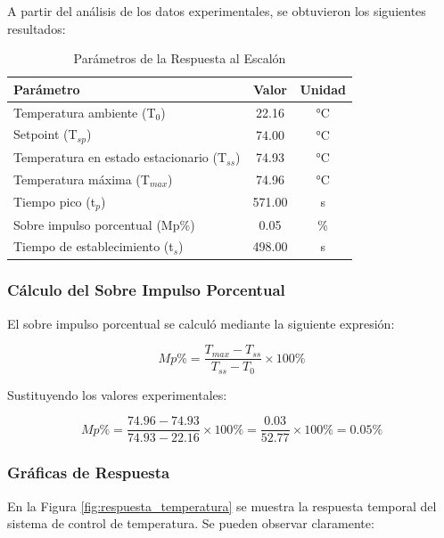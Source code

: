A partir del análisis de los datos experimentales, se obtuvieron los siguientes resultados:

\begin{table}[H]
	\centering
	\caption{Parámetros de la Respuesta al Escalón}
	\label{tab:parametros_escalon}
	
	
	
	\begin{tabular}{|l|c|c|}
		\hline
		\textbf{Parámetro} & \textbf{Valor} & \textbf{Unidad} \\ \hline
		Temperatura ambiente (T$_0$) & 22.16 & °C \\ \hline
		Setpoint (T$_{sp}$) & 74.00 & °C \\ \hline
		Temperatura en estado estacionario (T$_{ss}$) & 74.93 & °C \\ \hline
		Temperatura máxima (T$_{max}$) & 74.96 & °C \\ \hline
		Tiempo pico (t$_p$) & 571.00 & s \\ \hline
		Sobre impulso porcentual (Mp\%) & 0.05 & \% \\ \hline
		Tiempo de establecimiento (t$_s$) & 498.00 & s \\ \hline
	\end{tabular}
\end{table}

\subsubsection{Cálculo del Sobre Impulso Porcentual}

El sobre impulso porcentual se calculó mediante la siguiente expresión:

\begin{equation}
	Mp\% = \frac{T_{max} - T_{ss}}{T_{ss} - T_0} \times 100\%
\end{equation}

Sustituyendo los valores experimentales:

\begin{equation}
	Mp\% = \frac{74.96 - 74.93}{74.93 - 22.16} \times 100\% = \frac{0.03}{52.77} \times 100\% = 0.05\%
\end{equation}

\subsubsection{Gráficas de Respuesta}

En la Figura \ref{fig:respuesta_temperatura} se muestra la respuesta temporal del sistema de control de temperatura. Se pueden observar claramente:

